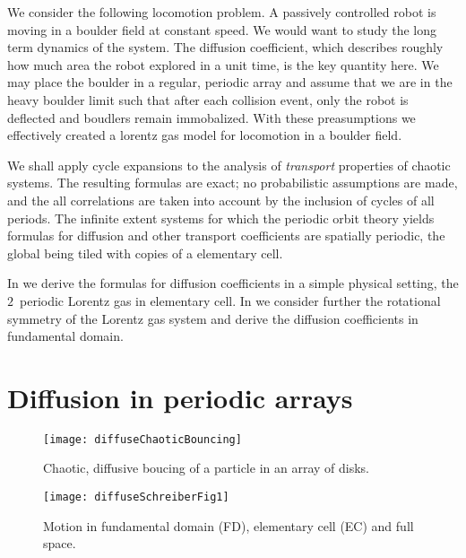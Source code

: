 \documentclass[aps,pre,preprint,groupedaddress, floatfix]{revtex4-1}
\begin{document}
We consider the following locomotion problem. A passively controlled robot is moving in a boulder field at constant speed. We would want to study the long term dynamics of the system. The diffusion coefficient, which describes roughly how much area the robot explored in a unit time, is the key quantity here. We may place the boulder in a regular, periodic array and assume that we are in the heavy boulder limit such that after each collision event, only the robot is deflected and boudlers remain immobalized. With these preasumptions we effectively created a lorentz gas model for locomotion in a boulder field.

We shall apply cycle expansions to the analysis of {\em transport} properties of
chaotic systems. The resulting formulas are exact; no probabilistic assumptions
are made, and the all correlations are taken into account by the inclusion of
cycles of all periods.  The infinite extent systems for which the periodic orbit
theory yields formulas for diffusion and other transport coefficients are
spatially periodic, the global {\statesp} being tiled with copies of a
elementary cell.

In  we derive the formulas for diffusion
coefficients in a simple physical setting, the $2$\dmn\ periodic Lorentz
gas in elementary cell. In we consider further the rotational symmetry of the Lorentz gas system and derive the diffusion coefficients in fundamental domain.

\section{Diffusion in periodic arrays}
\label{s-DiffPerArr}

\begin{figure}[htbp]
\begin{center}
\texttt{[image: diffuseChaoticBouncing]}
\end{center}
\caption[]{\label{fig:chaoticBouncing} Chaotic, diffusive boucing of a particle in an array of disks. }
\end{figure}

\begin{figure}[htbp]
\begin{center}
\texttt{[image: diffuseSchreiberFig1]}
\end{center}
\caption[]{\label{fig:schrieberFig1}Motion in fundamental domain (FD), elementary cell (EC) and full space.}

\end{figure}
\end{document}
